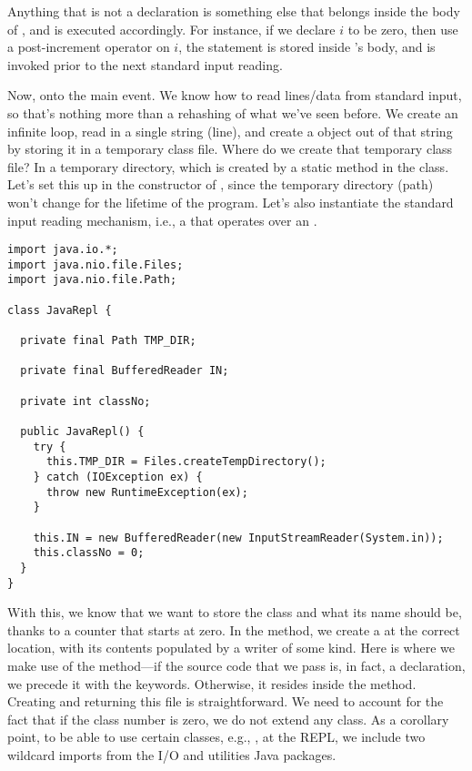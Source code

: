 Anything that is not a declaration is something else that belongs inside the body of , and is executed accordingly. For instance, if we declare $i$ to be zero, then use a post-increment operator on $i$, the  statement is stored inside 's  body, and is invoked prior to the next standard input reading. 

Now, onto the main event. We know how to read lines/data from standard input, so that's nothing more than a rehashing of what we've seen before. We create an infinite loop, read in a single string (line), and create a  object out of that string by storing it in a temporary class file. Where do we create that temporary class file? In a temporary directory, which is created by a static method in the class. Let's set this up in the constructor of , since the temporary directory (path) won't change for the lifetime of the program. Let's also instantiate the standard input reading mechanism, i.e., a  that operates over an .

\begin{cl}{}
\begin{lstlisting}[language=MyJava]
import java.io.*;
import java.nio.file.Files;
import java.nio.file.Path;

class JavaRepl {

  private final Path TMP_DIR;

  private final BufferedReader IN; 

  private int classNo;

  public JavaRepl() {
    try {
      this.TMP_DIR = Files.createTempDirectory();
    } catch (IOException ex) {
      throw new RuntimeException(ex);
    } 
    
    this.IN = new BufferedReader(new InputStreamReader(System.in));
    this.classNo = 0;
  }
}
\end{lstlisting}
\end{cl}

With this, we know that we want to store the class and what its name should be, thanks to a counter that starts at zero. In the  method, we create a  at the correct location, with its contents populated by a writer of some kind. Here is where we make use of the  method---if the source code that we pass is, in fact, a declaration, we precede it with the  keywords. Otherwise, it resides inside the  method. Creating and returning this file is straightforward. We need to account for the fact that if the class number is zero, we do not extend any class. As a corollary point, to be able to use certain classes, e.g., , at the REPL, we include two wildcard imports from the I/O and utilities Java packages.

